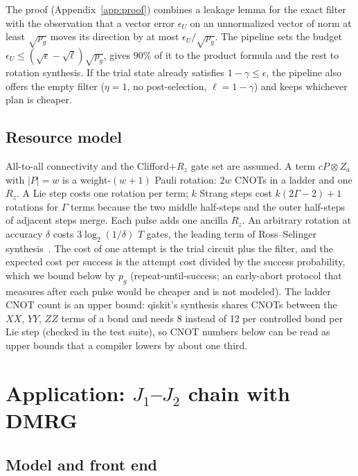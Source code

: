 \documentclass[aps,pra,twocolumn,superscriptaddress,nofootinbib]{revtex4-2}
\begin{document}
The proof (Appendix~\ref{app:proof}) combines a leakage lemma for the exact filter with the
observation that a vector error $\epsilon_U$ on an unnormalized vector of norm at least $\sqrt{p_g}$
moves its direction by at most $\epsilon_U/\sqrt{p_g}$. The pipeline sets the budget
$\epsilon_U\le(\sqrt\epsilon-\sqrt\ell)\sqrt{p_g}$, gives $90\%$ of it to the product formula and the
rest to rotation synthesis. If the trial state already satisfies $1-\gamma\le\epsilon$, the pipeline
also offers the empty filter ($\eta=1$, no post-selection, $\ell=1-\gamma$) and keeps whichever plan
is cheaper.

\subsection{Resource model}

All-to-all connectivity and the Clifford+$R_z$ gate set are assumed. A term $cP\otimes Z_a$ with
$|P|=w$ is a weight-$(w+1)$ Pauli rotation: $2w$ CNOTs in a ladder and one $R_z$. A Lie step costs one
rotation per term; $k$ Strang steps cost $k(2\Gamma-2)+1$ rotations for $\Gamma$ terms because the two
middle half-steps and the outer half-steps of adjacent steps merge. Each pulse adds one ancilla $R_z$.
An arbitrary rotation at accuracy $\delta$ costs $3\log_2(1/\delta)$ $T$ gates, the leading term of
Ross--Selinger synthesis~\cite{Ross2016}. The cost of one attempt is the trial circuit plus the
filter, and the expected cost per success is the attempt cost divided by the success probability,
which we bound below by $p_g$ (repeat-until-success; an early-abort protocol that measures after each
pulse would be cheaper and is not modeled). The ladder CNOT count is an upper bound: qiskit's
synthesis shares CNOTs between the $XX$, $YY$, $ZZ$ terms of a bond and needs 8 instead of 12 per
controlled bond per Lie step (checked in the test suite), so CNOT numbers below can be read as upper
bounds that a compiler lowers by about one third.

\section{Application: $J_1$--$J_2$ chain with DMRG}
\label{sec:application}

\subsection{Model and front end}
\end{document}
